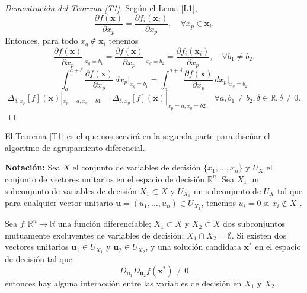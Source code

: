 \begin{proof}[Demostración del Teorema \ref{T1}]
Según el Lema \ref{L1},
\begin{equation}
\frac{\partial f(\mathbf{x})}{\partial x_p} = \frac{\partial f_i(\mathbf{x}_i)}{\partial x_p}, \quad \forall x_p \in \mathbf{x}_i.
\label{EQ12}
\end{equation}
Entonces, para todo \( x_q \notin \mathbf{x}_i \) tenemos
\begin{equation}
\frac{\partial f(\mathbf{x})}{\partial x_p} \bigg|_{x_q=b_1} = \frac{\partial f(\mathbf{x})}{\partial x_p} \bigg|_{x_q=b_2} = \frac{\partial f_i(\mathbf{x}_i)}{\partial x_p}, \quad \forall b_1 \neq b_2.
\label{EQ13}
\end{equation}
\begin{equation}
\int_{a}^{a+\delta} \frac{\partial f(\mathbf{x})}{\partial x_p} \, dx_p \bigg|_{x_q=b_1} = \int_{a}^{a+\delta} \frac{\partial f(\mathbf{x})}{\partial x_p} \, dx_p \bigg|_{x_q=b_2}
\label{EQ14}
\end{equation}
\begin{equation}
\Delta_{\delta,x_p}[f](\mathbf{x})|_{x_p=a, x_q=b1} = \Delta_{\delta,x_p}[f](\mathbf{x})|_{x_p=a, x_q=b2} \quad \forall a, b_1 \neq b_2, \delta \in \mathbb{R}, \delta \neq 0.
\label{EQ15}
\end{equation}
\end{proof}

El Teorema \ref{T1} es el que nos servirá en la segunda parte para diseñar el algoritmo de agrupamiento diferencial.

\textbf{Notación:} Sea \( X \) el conjunto de variables de decisión \(\{x_1, \ldots, x_n\}\) y \( U_X \) el conjunto de vectores unitarios en el espacio de decisión \(\mathbb{R}^n\). Sea \( X_1 \) un subconjunto de variables de decisión \( X_1 \subset X \) y \( U_{X_1} \) un subconjunto de \( U_X \) tal que para cualquier vector unitario \( \mathbf{u} = (u_1, \ldots, u_n) \in U_{X_1} \), tenemos \( u_i = 0 \) si \( x_i \notin X_1 \).

\begin{proposicion}
\label{P1}
Sea \( f : \mathbb{R}^n \to \overline{\mathbb{R}} \) una función diferenciable; \( X_1 \subset X \) y \( X_2 \subset X \) dos subconjuntos mutuamente excluyentes de variables de decisión: \( X_1 \cap X_2 = \emptyset \). Si existen dos vectores unitarios \( \mathbf{u}_1 \in U_{X_1} \) y \( \mathbf{u}_2 \in U_{X_2} \), y una solución candidata \( \mathbf{x}^* \) en el espacio de decisión tal que
\begin{equation}
D_{\mathbf{u}_1} D_{\mathbf{u}_2} f(\mathbf{x}^*) \neq 0
\label{EQ16}
\end{equation}
entonces hay alguna interacción entre las variables de decisión en \( X_1 \) y \( X_2 \).
\end{proposicion}

